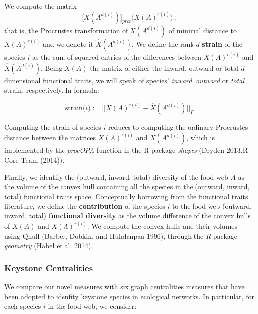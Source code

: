 \documentclass[11pt,article,oneside]{memoir}
\begin{document}
We compute the matrix
\[\bigg[X\left(A^{d(i)}\right)\bigg]_{proc}\bigg(X\left(A\right)^{r(i)}\bigg) \, ,\]
that is, the Procrustes transformation of \(X\left(A^{d(i)}\right)\) of
minimal distance to \(X(A)^{r(i)}\) and we denote it
\(\hat{X}\left(A^{d(i)}\right)\). We define the rank \(d\)
\textbf{strain} of the species \(i\) as the sum of squared entries of
the differences between \(X(A)^{r(i)}\) and
\(\hat{X}\left(A^{d(i)}\right)\). Being \(X(A)\) the matrix of either
the inward, outward or total \(d\) dimensional functional traits, we
will speak of species' \emph{inward}, \emph{outward} or \emph{total}
strain, respectively. In formula:

\begin{equation}
\mbox{strain($i$)} := ||X(A)^{r(i)} - \hat{X}\left(A^{d(i)}\right)||_F
\end{equation}

Computing the strain of species \(i\) reduces to computing the ordinary
Procrustes distance between the matrices \(X(A)^{r(i)}\) and
\(X\left(A^{d(i)}\right)\), which is implemented by the \emph{procOPA}
function in the R package \emph{shapes} (Dryden 2013,R Core Team
(2014)).

Finally, we identify the (outward, inward, total) diversity of the food
web \(A\) as the volume of the convex hull containing all the species in
the (outward, inward, total) functional traits space. Conceptually
borrowing from the functional traits literature, we define the
\textbf{contribution} of the species \(i\) to the food web (outward,
inward, total) \textbf{functional diversity} as the volume difference of
the convex hulls of \(X\left(A\right)\) and \(X\left(A\right)^{r(i)}\).
We compute the convex hulls and their volumes using Qhull (Barber,
Dobkin, and Huhdanpaa 1996), through the \emph{R} package
\emph{geometry} (Habel et al. 2014).

\subsubsection{Keystone Centralities}\label{keystone-centralities}

We compare our novel measures with six graph centralities measures that
have been adopted to idenfity keystone species in ecological networks.
In particular, for each species \(i\) in the food web, we consider:
\end{document}
